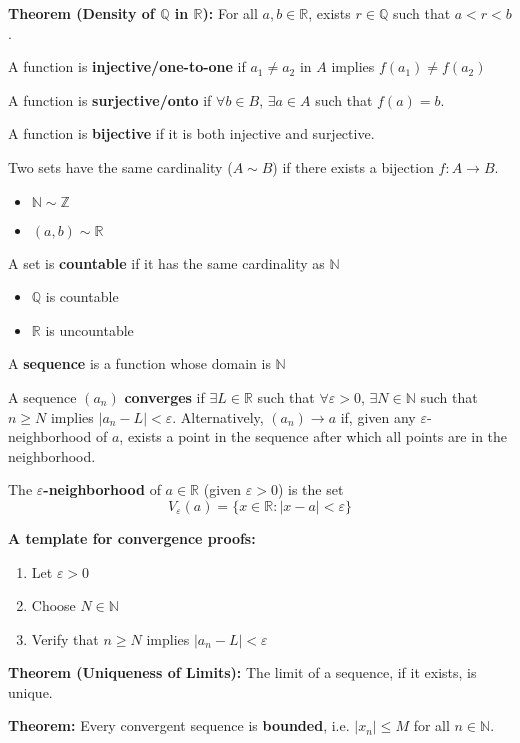 \documentclass[12pt]{article}
\newcommand{\R}{\mathbb{R}}
\newcommand{\Z}{\mathbb{Z}}
\newcommand{\N}{\mathbb{N}}
\newcommand{\Q}{\mathbb{Q}}
\newcommand{\abs}[1]{\left\vert #1 \right\vert}
\newcommand{\ep}{\varepsilon}
\begin{document}
\textbf{Theorem (Density of $\Q$ in $\R$):} For all $a, b \in \R$, exists $r \in \Q$ such that $a < r < b$. 

A function is \textbf{injective/one-to-one} if $a_1 \neq a_2$ in $A$ implies $f(a_1) \neq f(a_2)$

A function is \textbf{surjective/onto} if $\forall b \in B$, $\exists a \in A$ such that $f(a) = b$.

A function is \textbf{bijective} if it is both injective and surjective. 

Two sets have the same cardinality ($A \sim B$) if there exists a bijection $f: A \to B$.
\begin{itemize}
    \item $\N \sim \Z$
    \item $(a, b) \sim \R$
\end{itemize}

A set is \textbf{countable} if it has the same cardinality as $\N$
\begin{itemize}
    \item $\Q$ is countable 
    \item $\R$ is uncountable
\end{itemize}

A \textbf{sequence} is a function whose domain is $\N$

A sequence $(a_n)$ \textbf{converges} if $\exists L \in \R$ such that $\forall \ep > 0$, $\exists N \in \N$ such that $n \geq N$ implies $\abs{a_n - L} < \ep$. Alternatively, $(a_n) \to a$ if, given any $\ep$-neighborhood of $a$, exists a point in the sequence after which all points are in the neighborhood.

The \textbf{$\ep$-neighborhood} of $a \in \R$ (given $\ep > 0$) is the set 
\[V_{\ep}(a) = \{x \in \R: \abs{x - a} < \ep\}\]

\textbf{A template for convergence proofs:}
\begin{enumerate}
    \item Let $\ep > 0$ 
    \item Choose $N \in \N$ 
    \item Verify that $n \geq N$ implies $\abs{a_n - L} < \ep$
\end{enumerate}

\textbf{Theorem (Uniqueness of Limits):} The limit of a sequence, if it exists, is unique. 

\textbf{Theorem:} Every convergent sequence is \textbf{bounded}, i.e. $\abs{x_n} \leq M$ for all $n \in \N$. 
\end{document}
